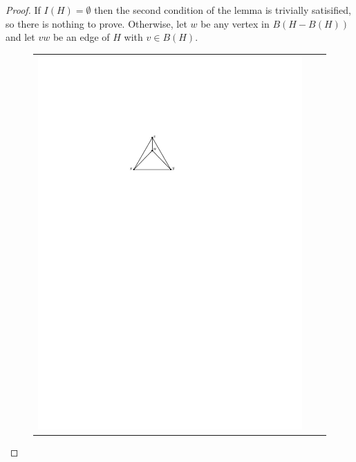 \documentclass[a4paper,UKenglish,cleveref, autoref, thm-restate]{lipics-v2021}
\begin{document}
\begin{proof}
  If $I(H)=\emptyset$ then the second condition of the lemma is trivially satisified, so there is nothing to prove. Otherwise, let $w$ be any vertex in $B(H-B(H))$ and let $vw$ be an edge of $H$ with $v\in B(H)$.


   \begin{figure}[htbp]
     \centering
     \begin{tabular}{ccc}
       \includegraphics[page=1]{figs/outer_2_2} &

\end{tabular}
\end{figure}
\end{proof}
\end{document}

